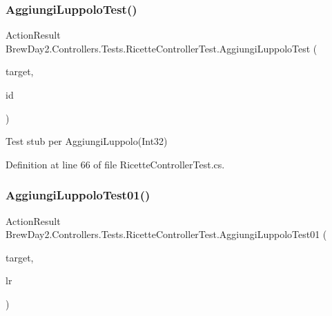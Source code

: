 \subsubsection{\texorpdfstring{Aggiungi\+Luppolo\+Test()}{AggiungiLuppoloTest()}}
{\footnotesize\ttfamily Action\+Result Brew\+Day2.\+Controllers.\+Tests.\+Ricette\+Controller\+Test.\+Aggiungi\+Luppolo\+Test (\begin{DoxyParamCaption}\item[{\mbox{[}\+Pex\+Assume\+Under\+Test\mbox{]} \mbox{\hyperlink{class_brew_day2_1_1_controllers_1_1_ricette_controller}{Ricette\+Controller}}}]{target,  }\item[{int}]{id }\end{DoxyParamCaption})}



Test stub per Aggiungi\+Luppolo(\+Int32)



Definition at line 66 of file Ricette\+Controller\+Test.\+cs.

\mbox{\label{class_brew_day2_1_1_controllers_1_1_tests_1_1_ricette_controller_test_a96b379cb8d013527ed23478b72ad1a87}} 
\subsubsection{\texorpdfstring{Aggiungi\+Luppolo\+Test01()}{AggiungiLuppoloTest01()}}
{\footnotesize\ttfamily Action\+Result Brew\+Day2.\+Controllers.\+Tests.\+Ricette\+Controller\+Test.\+Aggiungi\+Luppolo\+Test01 (\begin{DoxyParamCaption}\item[{\mbox{[}\+Pex\+Assume\+Under\+Test\mbox{]} \mbox{\hyperlink{class_brew_day2_1_1_controllers_1_1_ricette_controller}{Ricette\+Controller}}}]{target,  }\item[{\mbox{\hyperlink{class_brew_day2_1_1_models_1_1_luppoli_ricetta}{Luppoli\+Ricetta}}}]{lr }\end{DoxyParamCaption})}




